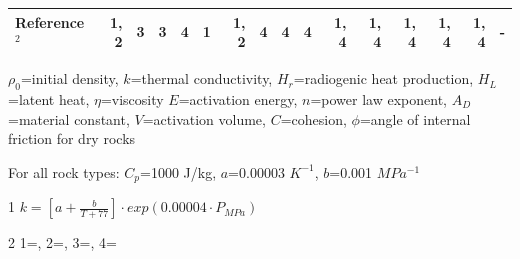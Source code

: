 \documentclass[draft]{agujournal2019}
\begin{document}
\begin{table}
\begin{threeparttable}
\begin{tabularx}{\textwidth}{L{2.75} R{0.5} R{0.5} R{0.5} R{0.5} R{0.5} R{1.5} R{0.5} R{0.5} R{0.5} R{0.5} R{0.75} R{0.75} R{0.75} R{0.5} R{0.75}}
   \midrule

   Reference$^2$             & 1, 2             & 3                                     & 3     & 4                   & 1               & 1, 2           & 4            & 4           & 4                & 1, 4  & 1, 4                  & 1, 4               & 1, 4        & 1, 4   & -          \\

   \bottomrule
  \end{tabularx}
  \begin{tablenotes}
   \footnotesize
   \item[] $\rho_0$=initial density, $k$=thermal conductivity, $H_r$=radiogenic heat production, $H_L$=latent heat, $\eta$=viscosity $E$=activation energy, $n$=power law exponent, $A_D$=material constant, $V$=activation volume, $C$=cohesion, $\phi$=angle of internal friction for dry rocks
   \item [] For all rock types: $C_p$=1000 J/kg, $a$=\num{0.00003} $K^{-1}$, $b$=\num{0.001} $MPa^{-1}$
   \item [1] $k = [a+\frac{b}{T+77}]\cdot exp(\num{0.00004}\cdot P_{MPa})$
   \item [2] 1=, 2=, 3=, 4=
  \end{tablenotes}
 \end{threeparttable}
\end{table}
\end{document}
